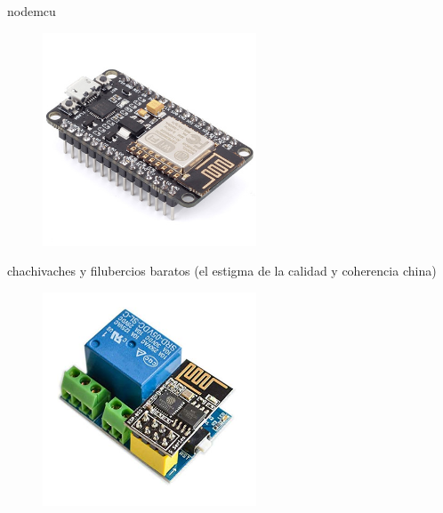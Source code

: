 nodemcu
\begin{figure}[hbt!]
\centering
\includegraphics[height=2.5in]{figures/nodemcu.jpg}
\end{figure}

chachivaches y filubercios baratos (el estigma de la calidad y coherencia china)
\begin{figure}[hbt!]
\centering
\includegraphics[height=2.5in]{figures/esp8266exRele.jpg}
\end{figure}
